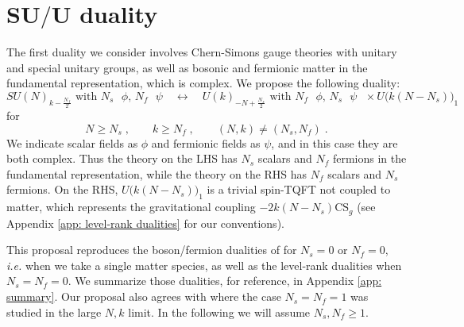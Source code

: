 \documentclass[a4paper, 12pt]{article}
\newcommand{\matht}[1]{\ensuremath{\boldsymbol{#1}}}
\newcommand{\ie}{\textit{i.e.}}
\numberwithin{equation}{section}
\newcommand{\be}{\begin{equation}} \newcommand{\ee}{\end{equation}}
\begin{document}

\section{\matht{SU/U} duality}
\label{sec: SU/U duality}

The first duality we consider involves Chern-Simons gauge theories with unitary and special unitary groups, as well as bosonic and fermionic matter in the fundamental representation, which is complex. We propose the following duality:
\be
\label{SU/U duality grav}
SU(N)_{k - \frac{N_f}2} \text{ with $N_s$ $\phi$, $N_f$ $\psi$} \quad\longleftrightarrow\quad U(k)_{-N + \frac{N_s}2}\text{ with $N_f$ $\phi$, $N_s$ $\psi$ }  \times U\big( k(N-N_s) \big)_1
\ee
for
\be
N \geq N_s \;,\qquad k \geq N_f \;,\qquad (N,k) \neq (N_s, N_f) \;.
\ee
We indicate scalar fields as $\phi$ and fermionic fields as $\psi$, and in this case they are both complex. Thus the theory on the LHS has $N_s$ scalars and $N_f$ fermions in the fundamental representation, while the theory on the RHS has $N_f$ scalars and $N_s$ fermions. On the RHS, $U\big(k(N - N_s)\big)_1$ is a trivial spin-TQFT \cite{Seiberg:2016gmd} not coupled to matter, which represents the gravitational coupling $-2k(N-N_s) \text{CS}_g$ (see Appendix \ref{app: level-rank dualities} for our conventions).

This proposal reproduces the boson/fermion dualities of \cite{Aharony:2015mjs, Hsin:2016blu} for $N_s=0$ or \mbox{$N_f=0$}, \ie{} when we take a single matter species, as well as the level-rank dualities when $N_s = N_f = 0$. We summarize those dualities, for reference, in Appendix \ref{app: summary}. Our proposal also agrees with \cite{Jain:2013gza} where the case $N_s = N_f =1$ was studied in the large $N,k$ limit. In the following we will assume $N_s,N_f\geq 1$.
\end{document}
